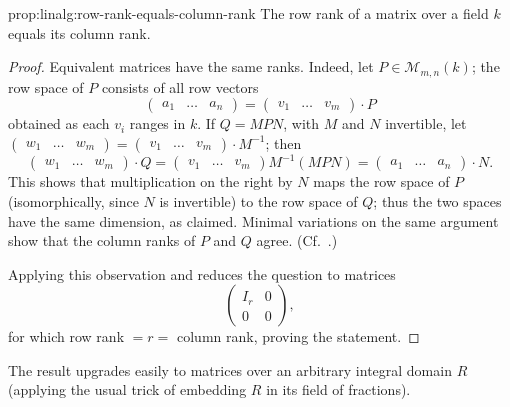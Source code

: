 \begin{prop}{}{prop:linalg:row-rank-equals-column-rank}
  The row rank of a matrix over a field $k$ equals its column rank.
\end{prop}
\begin{proof}
  Equivalent matrices have the same ranks. Indeed, let
  $P \in \mathcal{M}_{m,n}(k)$; the row space of $P$ consists of all
  row vectors
  \[
    \begin{pmatrix} a_1 & \dots & a_n \end{pmatrix} =
    \begin{pmatrix} v_1 & \dots & v_m \end{pmatrix} \cdot P
  \]
  obtained as each $v_i$ ranges in $k$. If $Q = MPN$, with $M$ and $N$
  invertible, let $\begin{pmatrix} w_1 & \dots & w_m \end{pmatrix} =
  \begin{pmatrix} v_1 & \dots & v_m \end{pmatrix} \cdot M^{-1}$; then
  \[
    \begin{pmatrix} w_1 & \dots & w_m \end{pmatrix} \cdot Q =
    \begin{pmatrix} v_1 & \dots & v_m \end{pmatrix} M^{-1}(MPN) =
    \begin{pmatrix} a_1 & \dots & a_n \end{pmatrix} \cdot N.
  \]
  This shows that multiplication on the right by $N$ maps the row
  space of $P$ (isomorphically, since $N$ is invertible) to the row
  space of $Q$; thus the two spaces have the same dimension, as
  claimed. Minimal variations on the same argument show that the
  column ranks of $P$ and $Q$ agree. (Cf.\
  .)

  Applying this observation and  reduces the
  question to matrices
  \[
    \left(
      \begin{array}{c|c}
        I_r & 0 \\
        \hline
        0 & 0
      \end{array}
    \right),
  \]
  for which row rank $= r =$ column rank, proving the statement.
\end{proof}

The result upgrades easily to matrices over an arbitrary integral
domain $R$ (applying the usual trick of embedding $R$ in its field of
fractions).

